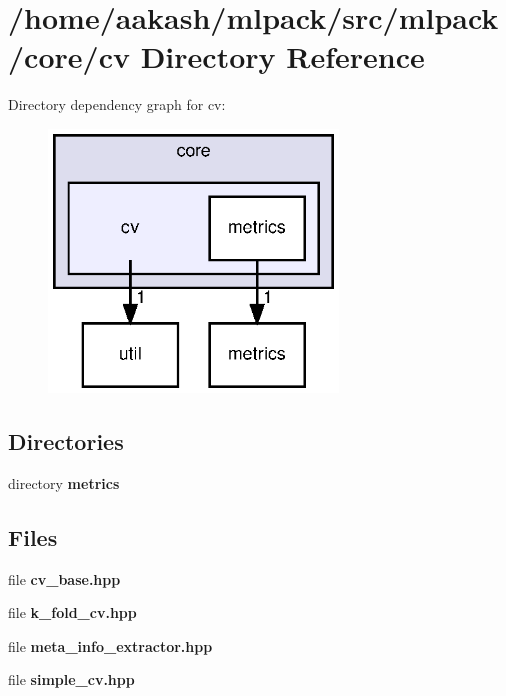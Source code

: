 \section{/home/aakash/mlpack/src/mlpack/core/cv Directory Reference}
\label{dir_29e6e7106bf5eaf4400485142c6c95d8}
Directory dependency graph for cv\+:
\nopagebreak
\begin{figure}[H]
\begin{center}
\leavevmode
\includegraphics[width=218pt]{dir_29e6e7106bf5eaf4400485142c6c95d8_dep}
\end{center}
\end{figure}
\subsection*{Directories}
\begin{DoxyCompactItemize}
\item 
directory \textbf{ metrics}
\end{DoxyCompactItemize}
\subsection*{Files}
\begin{DoxyCompactItemize}
\item 
file \textbf{ cv\+\_\+base.\+hpp}
\item 
file \textbf{ k\+\_\+fold\+\_\+cv.\+hpp}
\item 
file \textbf{ meta\+\_\+info\+\_\+extractor.\+hpp}
\item 
file \textbf{ simple\+\_\+cv.\+hpp}
\end{DoxyCompactItemize}
